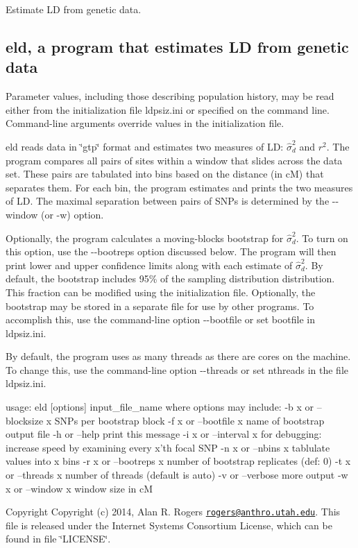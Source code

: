 Estimate L\+D from genetic data.

\subsection*{{\ttfamily eld}, a program that estimates L\+D from genetic data }

Parameter values, including those describing population history, may be read either from the initialization file {\ttfamily ldpsiz.\+ini} or specified on the command line. Command-\/line arguments override values in the initialization file.

{\ttfamily eld} reads data in \char`\"{}gtp\char`\"{} format and estimates two measures of L\+D\+: $\hat\sigma_d^2$ and $r^2$. The program compares all pairs of sites within a window that slides across the data set. These pairs are tabulated into bins based on the distance (in c\+M) that separates them. For each bin, the program estimates and prints the two measures of L\+D. The maximal separation between pairs of S\+N\+Ps is determined by the {\ttfamily -\/-\/window} (or {\ttfamily -\/w}) option.

Optionally, the program calculates a moving-\/blocks bootstrap for $\hat\sigma_d^2$. To turn on this option, use the {\ttfamily -\/-\/bootreps} option discussed below. The program will then print lower and upper confidence limits along with each estimate of $\hat\sigma_d^2$. By default, the bootstrap includes 95\% of the sampling distribution distribution. This fraction can be modified using the initialization file. Optionally, the bootstrap may be stored in a separate file for use by other programs. To accomplish this, use the command-\/line option {\ttfamily -\/-\/bootfile} or set {\ttfamily bootfile} in {\ttfamily ldpsiz.\+ini}.

By default, the program uses as many threads as there are cores on the machine. To change this, use the command-\/line option {\ttfamily -\/-\/threads} or set {\ttfamily nthreads} in the file {\ttfamily ldpsiz.\+ini}. \begin{DoxyVerb}usage: eld [options] input_file_name
   where options may include:
   -b \<x\> or --blocksize \<x\>
      SNPs per bootstrap block
   -f \<x\> or --bootfile \<x\>
      name of bootstrap output file
   -h or --help
      print this message
   -i \<x\> or --interval \<x\>
      for debugging: increase speed by examining every x'th focal SNP
   -n \<x\> or --nbins \<x\>
      tablulate values into x bins
   -r \<x\> or --bootreps \<x\>
      number of bootstrap replicates (def: 0)
   -t \<x\> or --threads \<x\>
      number of threads (default is auto)
   -v     or --verbose
      more output
   -w \<x\> or --window \<x\>
      window size in cM
\end{DoxyVerb}


\begin{DoxyCopyright}{Copyright}
Copyright (c) 2014, Alan R. Rogers \href{mailto:rogers@anthro.utah.edu}{\tt rogers@anthro.\+utah.\+edu}. This file is released under the Internet Systems Consortium License, which can be found in file \char`\"{}\+L\+I\+C\+E\+N\+S\+E\char`\"{}. 
\end{DoxyCopyright}
